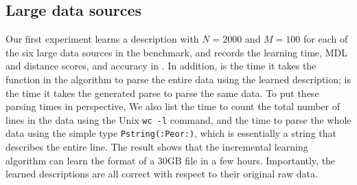 \subsection{Large data sources}

Our first experiment learns a description with $N=2000$
and $M = 100$ for each of the six 
large data sources in the benchmark, 
and records the learning time, MDL and distance scores, and accuracy in
. In addition,  is the time it takes
the  function in the algorithm to parse the entire data using the
learned description;  is the time it takes the generated \pads{}
parse to parse the same data. To put these parsing times in perspective,
We also list the time to count the total number of lines in the data using 
the Unix {\tt wc -l} command, and the time to parse the whole data using
the simple \pads{} type {\tt Pstring(:Peor:)}, 
which is essentially a string that
describes the entire line. The result shows that the incremental
learning algorithm can learn the format of a 30GB file in a few hours.  Importantly,
the learned descriptions are all correct with respect to their original
raw data.


